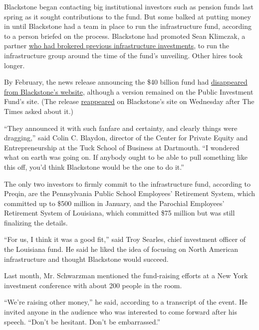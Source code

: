 Blackstone began contacting big institutional investors such as pension
funds last spring as it sought contributions to the fund. But some
balked at putting money in until Blackstone had a team in place to run
the infrastructure fund, according to a person briefed on the process.
Blackstone had promoted Sean Klimczak, a partner
\href{https://www.wsj.com/articles/blackstones-100-billion-bridge-and-tunnel-man-1495618203}{who
had brokered previous infrastructure investments}, to run the
infrastructure group around the time of the fund's unveiling. Other
hires took longer.

By February, the news release announcing the \$40 billion fund had
\href{https://web.archive.org/web/20180227170302/https://www.blackstone.com/media/press-releases/blackstone-to-launch-$40-billion-infrastructure-investment-vehicle-and-new-infrastructure-business}{disappeared
from Blackstone's website}, although a version remained on the Public
Investment Fund's site. (The release
\href{https://www.blackstone.com/media/press-releases/blackstone-to-launch-\%2440-billion-infrastructure-investment-vehicle-and-new-infrastructure-business}{reappeared}
on Blackstone's site on Wednesday after The Times asked about it.)

``They announced it with such fanfare and certainty, and clearly things
were dragging,'' said Colin C. Blaydon, director of the Center for
Private Equity and Entrepreneurship at the Tuck School of Business at
Dartmouth. ``I wondered what on earth was going on. If anybody ought to
be able to pull something like this off, you'd think Blackstone would be
the one to do it.''

The only two investors to firmly commit to the infrastructure fund,
according to Preqin, are the Pennsylvania Public School Employees'
Retirement System, which committed up to \$500 million in January, and
the Parochial Employees' Retirement System of Louisiana, which committed
\$75 million but was still finalizing the details.

``For us, I think it was a good fit,'' said Troy Searles, chief
investment officer of the Louisiana fund. He said he liked the idea of
focusing on North American infrastructure and thought Blackstone would
succeed.

Last month, Mr. Schwarzman mentioned the fund-raising efforts at a New
York investment conference with about 200 people in the room.

``We're raising other money,'' he said, according to a transcript of the
event. He invited anyone in the audience who was interested to come
forward after his speech. ``Don't be hesitant. Don't be embarrassed.''

